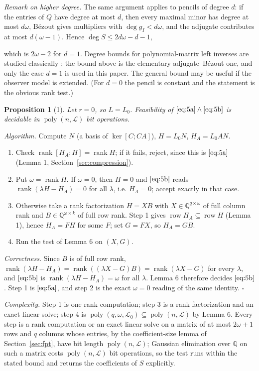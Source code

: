 \documentclass[journal]{IEEEtran}
\theoremstyle{plainn}
\newtheorem*{prop}{Proposition}
\theoremstyle{remark}
\begin{document}
\emph{Remark on higher degree.} The same argument applies to pencils of degree $d$: if the entries of $Q$ have degree at most $d$, then every maximal minor has degree at most $d\omega$, B\'ezout gives multipliers with $\deg g_I<d\omega$, and the adjugate contributes at most $d(\omega-1)$. Hence $\deg S\le 2d\omega-d-1$,

which is $2\omega-2$ for $d=1$. Degree bounds for polynomial-matrix left inverses are studied classically \cite{fab90}; the bound above is the elementary adjugate--B\'ezout one, and only the case $d=1$ is used in this paper. The general bound may be useful if the observer model is extended. (For $d=0$ the pencil is constant and the statement is the obvious rank test.)

\begin{prop}[1] Let $r=0$, so $L=L_0$. Feasibility of $\eqref{eq:5a}\wedge\eqref{eq:5b}$ is decidable in $\operatorname{poly}(n,\mathcal L)$ bit operations.
\end{prop}

\emph{Algorithm.} Compute $N$ (a basis of $\ker[C;CA]$), $H=L_0N$, $H_A=L_0AN$.

\begin{enumerate}
\item Check $\operatorname{rank}[H_A;H]=\operatorname{rank}H$; if it fails, reject, since this is $\eqref{eq:5a}$ (Lemma 1, Section~\ref{sec:compression}).
\item Put $\omega=\operatorname{rank}H$. If $\omega=0$, then $H=0$ and $\eqref{eq:5b}$ reads $\operatorname{rank}(\lambda H-H_A)=0$ for all $\lambda$, i.e. $H_A=0$; accept exactly in that case.
\item Otherwise take a rank factorization $H=XB$ with $X\in\mathbb Q^{q\times\omega}$ of full column rank and $B\in\mathbb Q^{\omega\times k}$ of full row rank. Step 1 gives $\operatorname{row}H_A\subseteq\operatorname{row}H$ (Lemma 1), hence $H_A=FH$ for some $F$; set $G=FX$, so $H_A=GB$.
\item Run the test of Lemma 6 on $(X,G)$.
\end{enumerate}
\emph{Correctness.} Since $B$ is of full row rank, $\operatorname{rank}(\lambda H-H_A)=\operatorname{rank}((\lambda X-G)B) =\operatorname{rank}(\lambda X-G)$ for every $\lambda$, and $\eqref{eq:5b}$ is $\operatorname{rank}(\lambda H-H_A)=\omega$ for all $\lambda$. Lemma 6 therefore decides $\eqref{eq:5b}$. Step 1 is $\eqref{eq:5a}$, and step 2 is the exact $\omega=0$ reading of the same identity. $\square$

\emph{Complexity.} Step 1 is one rank computation; step 3 is a rank factorization and an
exact linear solve; step 4 is $\operatorname{poly}(q,\omega,\mathcal L_0)\subseteq\operatorname{poly}(n,\mathcal L)$ by Lemma 6. Every step is a rank computation or an exact linear solve on a matrix of at most
$2\omega+1$ rows and $q$ columns whose entries, by the coefficient-size lemma of
Section~\ref{sec:fpt}, have bit length $\operatorname{poly}(n,\mathcal L)$; Gaussian
elimination over $\mathbb Q$ on such a matrix costs
$\operatorname{poly}(n,\mathcal L)$ bit operations, so the test runs within the stated
bound and returns the coefficients of $S$ explicitly.
\end{document}
